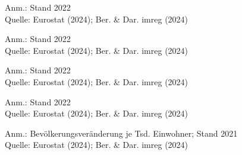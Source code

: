 \begin{figure}[p]
	{\centering {}}
	\label{map:einwohner}
	\begin{spacing}{1} \scriptsize
		Anm.: Stand 2022\\
		Quelle: Eurostat (2024); Ber. \& Dar. imreg (2024) \end{spacing}
\end{figure}


\begin{figure}[p]
	{\centering {}}
	\label{map:haushalte}
	\begin{spacing}{1} \scriptsize
		Anm.: Stand 2022\\
		Quelle: Eurostat (2024); Ber. \& Dar. imreg (2024) \end{spacing}
\end{figure}


\begin{figure}[p]
	{\centering {}}
	\label{map:haushaltestadt}
	\begin{spacing}{1} \scriptsize
		Anm.: Stand 2022\\
		Quelle: Eurostat (2024); Ber. \& Dar. imreg (2024) \end{spacing}
\end{figure}


\begin{figure}[p]
	{\centering {}}
	\label{map:bevdichte}
	\begin{spacing}{1} \scriptsize
		Anm.: Stand 2022\\
		Quelle: Eurostat (2024); Ber. \& Dar. imreg (2024) \end{spacing}
\end{figure}


\begin{figure}[p]
	{\centering {}}
	\label{map:bevrate}
	\begin{spacing}{1} \scriptsize
		Anm.: Bevölkerungsveränderung je Tsd. Einwohner; Stand 2021\\
		Quelle: Eurostat (2024); Ber. \& Dar. imreg (2024) \end{spacing}
\end{figure}



